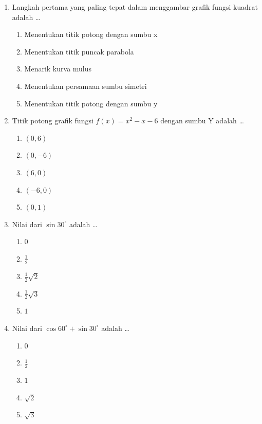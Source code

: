 \documentclass[12pt,a4paper]{article}
\begin{document}
\begin{enumerate}[leftmargin=*]
\item Langkah pertama yang paling tepat dalam menggambar grafik fungsi kuadrat adalah \dots
    \begin{enumerate}[label=\alph*.]
        \item Menentukan titik potong dengan sumbu x
        \item Menentukan titik puncak parabola
        \item Menarik kurva mulus
        \item Menentukan persamaan sumbu simetri
        \item Menentukan titik potong dengan sumbu y
    \end{enumerate}

\item Titik potong grafik fungsi $f(x) = x^2 - x - 6$ dengan sumbu Y adalah \dots
    \begin{enumerate}[label=\alph*.]
        \item $(0, 6)$
        \item $(0, -6)$
        \item $(6, 0)$
        \item $(-6, 0)$
        \item $(0, 1)$
    \end{enumerate}

\item Nilai dari $\sin 30^\circ$ adalah \dots
    \begin{enumerate}[label=\alph*.]
        \item $0$
        \item $\frac{1}{2}$
        \item $\frac{1}{2}\sqrt{2}$
        \item $\frac{1}{2}\sqrt{3}$
        \item $1$
    \end{enumerate}

\item Nilai dari $\cos 60^\circ + \sin 30^\circ$ adalah \dots
    \begin{enumerate}[label=\alph*.]
        \item $0$
        \item $\frac{1}{2}$
        \item $1$
        \item $\sqrt{2}$
        \item $\sqrt{3}$
    \end{enumerate}


\end{enumerate}
\end{document}
